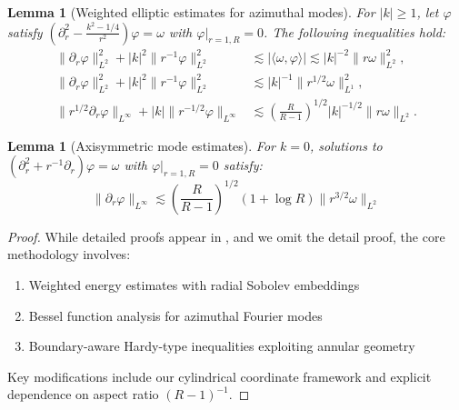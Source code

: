 \documentclass[final, 12pt,reqno]{amsart}
\newtheorem{lemma}[theorem]{\bf Lemma}
\numberwithin{equation}{section}
\begin{document}
\begin{lemma}[Weighted elliptic estimates for azimuthal modes] \label{lem2.1}
For $|k| \geq 1$, let $\varphi$ satisfy $\left(\partial_r^2 - \frac{k^2 - 1/4}{r^2}\right) \varphi = \omega$ with $\varphi|_{r=1,R} = 0$. The following inequalities hold:
\begin{align}
\|\partial_r \varphi\|_{L^2}^2 + |k|^2 \|r^{-1}\varphi\|_{L^2}^2 &\lesssim |\langle \omega, \varphi\rangle| \lesssim |k|^{-2} \|r \omega\|_{L^2}^2,\\
\|\partial_r \varphi\|_{L^2}^2 + |k|^2 \|r^{-1}\varphi\|_{L^2}^2 &\lesssim |k|^{-1} \|r^{1/2} \omega\|_{L^1}^2,\\
\|r^{1/2} \partial_r \varphi\|_{L^{\infty}} + |k| \|r^{-1/2} \varphi\|_{L^{\infty}} &\lesssim \left(\frac{R}{R-1}\right)^{1/2} |k|^{-1/2} \|r \omega\|_{L^2}.
\end{align}
\end{lemma}
\begin{lemma}[Axisymmetric mode estimates] \label{lem2.2}
For $k=0$, solutions to $\left(\partial_r^2 + r^{-1}\partial_r\right) \varphi = \omega$ with $\varphi|_{r=1,R} = 0$ satisfy:
\begin{equation}
\|\partial_r \varphi\|_{L^\infty} \lesssim \left(\frac{R}{R-1}\right)^{1/2} (1 + \log R) \|r^{3/2} \omega\|_{L^2}
\end{equation}
\end{lemma}
\begin{proof}
While detailed proofs appear in \cite{An.2024}, and we omit the detail proof, the core methodology involves:
\begin{enumerate}
\item Weighted energy estimates with radial Sobolev embeddings
\item Bessel function analysis for azimuthal Fourier modes
\item Boundary-aware Hardy-type inequalities exploiting annular geometry
\end{enumerate}
Key modifications include our cylindrical coordinate framework and explicit dependence on aspect ratio $(R-1)^{-1}$.
\end{proof}
\end{document}
